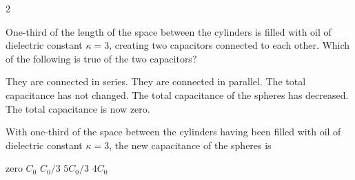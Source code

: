 \documentclass{../../../oss-apphys-exam}
\newcounter{last}
\begin{document}
\begin{multicols*}{2}
\begin{questions}
    \question One-third of the length of the space between the cylinders is
    filled with oil of dielectric constant $\kappa=3$, creating two capacitors
    connected to each other. Which of the following is true of the two
    capacitors?
    \begin{choices}
      \choice They are connected in series.
      \choice They are connected in parallel.
      \choice The total capacitance has not changed.
      \choice The total capacitance of the spheres has decreased.
      \choice The total capacitance is now zero.
    \end{choices}
    \vspace{.7in}
    
    \question With one-third of the space between the cylinders having been
    filled with oil of dielectric constant $\kappa=3$, the new capacitance of
    the spheres is
    \begin{choices}
      \choice zero
      \choice $C _0$
      \choice $C_0/3$
      \choice $5C_0/3$
      \choice $4C_0$
    \end{choices}
    \label{cyl2}
  \end{questions}
  \setcounter{last}{\value{question}}
\end{multicols*}
\newpage

\end{document}
